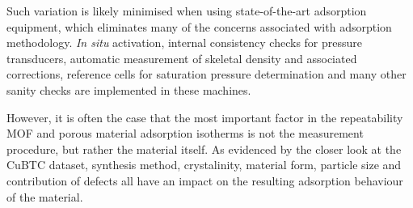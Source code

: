 Such variation is likely minimised when using state-of-the-art
adsorption equipment, which eliminates many of the concerns
associated with adsorption methodology. \textit{In situ}
activation, internal consistency checks for pressure transducers,
automatic measurement of skeletal density and associated
corrections, reference cells for saturation pressure determination
and many other sanity checks are implemented in these machines.

However, it is often the case that the most important factor
in the repeatability MOF and porous material adsorption isotherms
is not the measurement procedure, but rather the material itself.
As evidenced by the closer look at the CuBTC dataset, synthesis
method, crystalinity, material form, particle size and contribution
of defects all have an impact on the resulting adsorption behaviour
of the material.